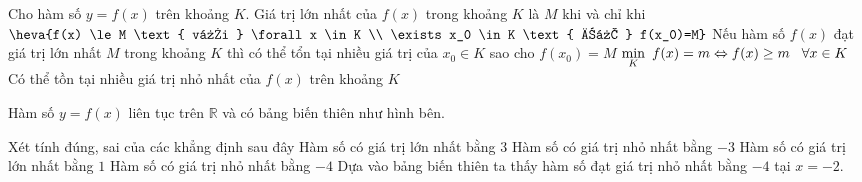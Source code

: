 \BTTF
\begin{ex}%
    Cho hàm số $y=f(x)$ trên khoảng $K$.
    \choiceTF
    {\True Giá trị lớn nhất của $f(x)$ trong khoảng $K$ là $M$ khi và chỉ khi $ \heva{f(x) \le M \text{ với } \forall x \in K \\ \exists x_0 \in K \text{ để } f(x_0)=M}$}
    {\True Nếu hàm số $f(x)$ đạt giá trị lớn nhất $M$ trong khoảng $K$ thì có thể tổn tại nhiều giá trị của $x_0 \in K$ sao cho $f(x_0)=M$}
    {$\mathop {\min }\limits_{K} \,\,f(x) = m \Leftrightarrow f(x) \ge m \hspace{0.3cm} \forall x \in K$}
    {Có thể tồn tại nhiều giá trị nhỏ nhất của $f(x)$ trên khoảng $K$}
\end{ex}
\begin{ex}%
    Hàm số $y=f(x)$ liên tục trên $\mathbb{R}$ và có bảng biến thiên như hình bên.
    \begin{center}
    \end{center}
    Xét tính đúng, sai của các khẳng định sau đây
    \choiceTF
    {Hàm số có giá trị lớn nhất bằng $3$}
    {Hàm số có giá trị nhỏ nhất bằng $-3$}
    {Hàm số có giá trị lớn nhất bằng $1$}
    {\True Hàm số có giá trị nhỏ nhất bằng $-4$}
    \loigiai
    {Dựa vào bảng biến thiên ta thấy hàm số đạt giá trị nhỏ nhất bằng $-4$ tại $x=-2$.
    }
\end{ex}
